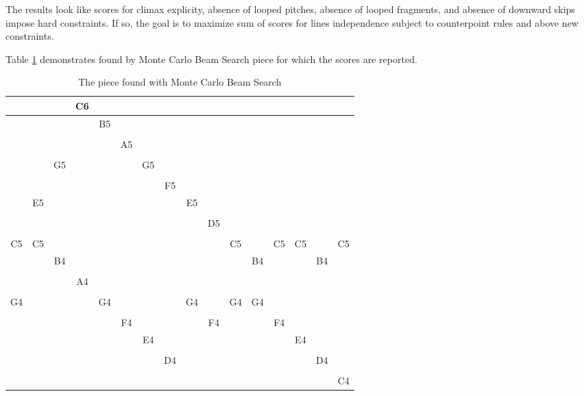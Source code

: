 \documentclass{article}
\begin{document}
The results look like scores for climax explicity, absence of looped pitches, absence of looped fragments, and absence of downward skips impose hard constraints. If so, the goal is to maximize sum of scores for lines independence subject to counterpoint rules and above new constraints.

Table \ref{table:piece} demonstrates found by Monte Carlo Beam Search piece for which the scores are reported.

\begin{table}[h!]
	\caption{The piece found with Monte Carlo Beam Search}
	\label{table:piece}
	\begin{center}
		\begin{tabular}{|c|c|c|c|c|c|c|c|c|c|c|c|c|c|c|c|}
			\hline
			& & & C6 & & & & & & & & & & & & \\
			\hline
			& & & & B5 & & & & & & & & & & & \\
			\hline
			& & & & & & & & & & & & & & & \\
			\hline
			& & & & & A5 & & & &  & & & & & & \\
			\hline
			& & & & & & & & & & & & & & & \\
			\hline
			& & G5 & & & & G5 & & & & & & & & & \\
			\hline
			& & & & & & & & & & & & & & & \\
			\hline
			& & & & & & & F5 & & & & & & & & \\
			\hline
			& E5 & & & & & & & E5 & & & & & & & \\
			\hline
			& & & & & & & & & & & & & & & \\
			\hline
			& & & & & & & & & D5 & & & & & & \\
			\hline
			& & & & & & & & & & & & & & & \\
			\hline
			C5 & C5 & & & & & & & & & C5 & & C5 & C5 & & C5 \\
			\hline
			& & B4 & & & & & & & & & B4 & & & B4 & \\
			\hline
			& & & & & & & & & & & & & & & \\
			\hline
			& & & A4 & & & & & & & & & & & & \\
			\hline
			& & & & & & & & & & & & & & & \\
			\hline
			G4 & & & & G4 & & & & G4 & & G4 & G4 & & & & \\
			\hline
			& & & & & & & & & & & & & & & \\
			\hline
			& & & & & F4 & & & & F4 & & & F4 & & & \\
			\hline
			& & & & & & E4 & & & & & & & E4 & & \\
			\hline
			& & & & & & & & & & & & & & & \\
			\hline
			& & & & & & & D4 & & & & & & & D4 & \\
			\hline
			& & & & & & & & & & & & & & & \\
			\hline
			& & & & & & & & & & & & & & & C4 \\
			\hline
		\end{tabular}
	\end{center}
\end{table}
\end{document}
